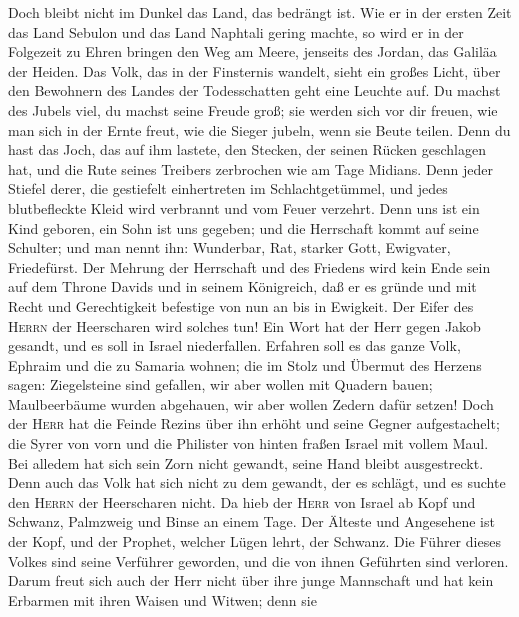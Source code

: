  Doch bleibt nicht im Dunkel das Land, das bedrängt ist.
Wie er in der ersten Zeit das Land Sebulon und das Land Naphtali gering
machte, so wird er in der Folgezeit zu Ehren bringen den Weg am Meere,
jenseits des Jordan, das Galiläa der Heiden.  Das Volk,
das in der Finsternis wandelt, sieht ein großes Licht, über den
Bewohnern des Landes der Todesschatten geht eine Leuchte auf.
 Du machst des Jubels viel, du machst seine Freude groß;
sie werden sich vor dir freuen, wie man sich in der Ernte freut, wie die
Sieger jubeln, wenn sie Beute teilen.  Denn du hast das
Joch, das auf ihm lastete, den Stecken, der seinen Rücken geschlagen
hat, und die Rute seines Treibers zerbrochen wie am Tage Midians.
 Denn jeder Stiefel derer, die gestiefelt einhertreten im
Schlachtgetümmel, und jedes blutbefleckte Kleid wird verbrannt und vom
Feuer verzehrt.  Denn uns ist ein Kind geboren, ein Sohn
ist uns gegeben; und die Herrschaft kommt auf seine Schulter; und man
nennt ihn: Wunderbar, Rat, starker Gott, Ewigvater, Friedefürst.
 Der Mehrung der Herrschaft und des Friedens wird kein
Ende sein auf dem Throne Davids und in seinem Königreich, daß er es
gründe und mit Recht und Gerechtigkeit befestige von nun an bis in
Ewigkeit. Der Eifer des \textsc{Herrn} der Heerscharen wird solches tun!
 Ein Wort hat der Herr gegen Jakob gesandt, und es soll in
Israel niederfallen.  Erfahren soll es das ganze Volk,
Ephraim und die zu Samaria wohnen; die im Stolz und Übermut des Herzens
sagen:  Ziegelsteine sind gefallen, wir aber wollen mit
Quadern bauen; Maulbeerbäume wurden abgehauen, wir aber wollen Zedern
dafür setzen!  Doch der \textsc{Herr} hat die Feinde
Rezins über ihn erhöht und seine Gegner aufgestachelt; 
die Syrer von vorn und die Philister von hinten fraßen Israel mit vollem
Maul. Bei alledem hat sich sein Zorn nicht gewandt, seine Hand bleibt
ausgestreckt.  Denn auch das Volk hat sich nicht zu dem
gewandt, der es schlägt, und es suchte den \textsc{Herrn} der
Heerscharen nicht.  Da hieb der \textsc{Herr} von Israel
ab Kopf und Schwanz, Palmzweig und Binse an einem Tage. 
Der Älteste und Angesehene ist der Kopf, und der Prophet, welcher Lügen
lehrt, der Schwanz.  Die Führer dieses Volkes sind seine
Verführer geworden, und die von ihnen Geführten sind verloren.
 Darum freut sich auch der Herr nicht über ihre junge
Mannschaft und hat kein Erbarmen mit ihren Waisen und Witwen; denn sie
